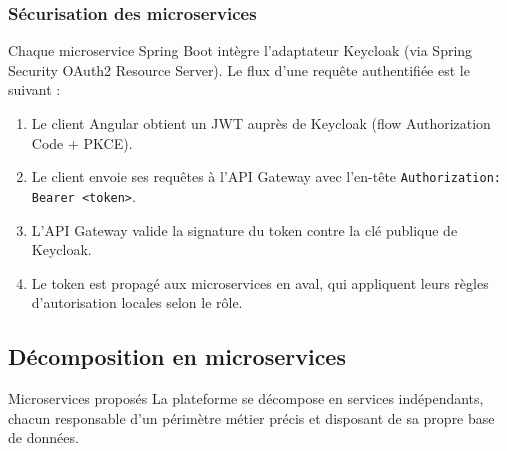 \documentclass[12pt,a4paper]{article}
\begin{document}
\subsubsection{Sécurisation des microservices}

Chaque microservice Spring Boot intègre l'adaptateur Keycloak (via Spring Security OAuth2 Resource Server). Le flux d'une requête authentifiée est le suivant :

\begin{enumerate}[leftmargin=*,itemsep=4pt]
    \item Le client Angular obtient un JWT auprès de Keycloak (flow Authorization Code + PKCE).
    \item Le client envoie ses requêtes à l'API Gateway avec l'en-tête \texttt{Authorization: Bearer <token>}.
    \item L'API Gateway valide la signature du token contre la clé publique de Keycloak.
    \item Le token est propagé aux microservices en aval, qui appliquent leurs règles d'autorisation locales selon le rôle.
\end{enumerate}

\subsection{Décomposition en microservices}

\begin{infobox}{Microservices proposés}
La plateforme se décompose en services indépendants, chacun responsable d'un périmètre métier précis et disposant de sa propre base de données.
\end{infobox}
\end{document}
